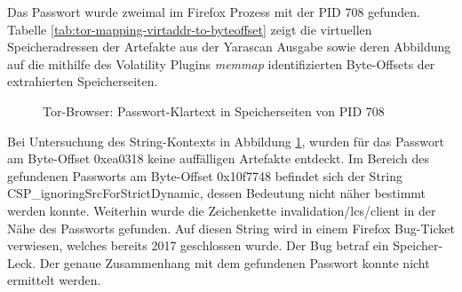 \begin{table}[h!]
	\centering
	\caption{Tor-Browser: Abbildung der virtuellen Speicheradressen der gefundenen Strings im RAM auf Byte-Offsets der entsprechenden Speicherseiten}
	\label{tab:tor-mapping-virtaddr-to-byteoffset}
\end{table}

Das Passwort wurde zweimal im Firefox Prozess mit der PID 708 gefunden. Tabelle \ref{tab:tor-mapping-virtaddr-to-byteoffset} zeigt die virtuellen Speicheradressen der Artefakte aus der Yarascan Ausgabe sowie deren Abbildung auf die mithilfe des Volatility Plugins \textit{memmap} identifizierten Byte-Offsets der extrahierten Speicherseiten.


\begin{figure}[h!]
	\centering
	\hfill
	\caption{Tor-Browser: Passwort-Klartext in Speicherseiten von PID 708}
	\label{img:firefox-pw-offset-pid-708}  
\end{figure}
Bei Untersuchung des String-Kontexts in Abbildung \ref{img:firefox-pw-offset-pid-708}, wurden für das Passwort am Byte-Offset 0xea0318 keine auffälligen Artefakte entdeckt.
Im Bereich des gefundenen Passworts am Byte-Offset 0x10f7748 befindet sich der String \grqq{}CSP\_ignoringSrcForStrictDynamic\grqq{}, dessen Bedeutung nicht näher bestimmt werden konnte.
Weiterhin wurde die Zeichenkette \grqq{}invalidation/lcs/client\grqq{} in der Nähe des Passworts gefunden. Auf diesen String wird in einem Firefox Bug-Ticket verwiesen, welches bereits 2017 geschlossen wurde. Der Bug betraf ein Speicher-Leck. \cite{Bugzilla.05.06.2023} Der genaue Zusammenhang mit dem gefundenen Passwort konnte nicht ermittelt werden. 
	
